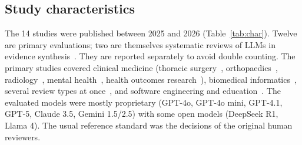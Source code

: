\documentclass[12pt,a4paper]{article}
\begin{document}
\subsection{Study characteristics}
The 14 studies were published between 2025 and 2026 (Table~\ref{tab:char}). Twelve are primary
evaluations; two are themselves systematic reviews of LLMs in evidence synthesis~\cite{s014,s037}.
They are reported separately to avoid double counting. The primary studies covered clinical
medicine (thoracic surgery~\cite{s027}, orthopaedics~\cite{s038}, radiology~\cite{s035}, mental
health~\cite{s032}, health outcomes research~\cite{s008}), biomedical informatics~\cite{s002}, several
review types at once~\cite{s010,s031,s033}, and software engineering and education~\cite{s009,s036}.
The evaluated models were mostly proprietary (GPT-4o, GPT-4o mini, GPT-4.1, GPT-5, Claude 3.5,
Gemini 1.5/2.5) with some open models (DeepSeek R1, Llama 4). The usual reference standard
was the decisions of the original human reviewers.
\end{document}
